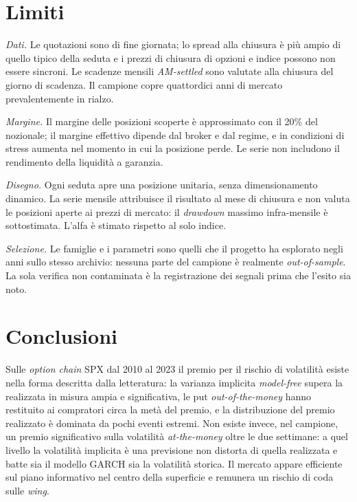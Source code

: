 \documentclass[11pt,a4paper]{article}
\begin{document}
\section{Limiti}\label{sec:limiti}

\emph{Dati.} Le quotazioni sono di fine giornata; lo spread alla chiusura è più ampio di quello tipico della seduta e i prezzi di chiusura di opzioni e indice possono non essere sincroni. Le scadenze mensili \emph{AM-settled} sono valutate alla chiusura del giorno di scadenza. Il campione copre quattordici anni di mercato prevalentemente in rialzo.

\emph{Margine.} Il margine delle posizioni scoperte è approssimato con il 20\% del nozionale; il margine effettivo dipende dal broker e dal regime, e in condizioni di stress aumenta nel momento in cui la posizione perde. Le serie non includono il rendimento della liquidità a garanzia.

\emph{Disegno.} Ogni seduta apre una posizione unitaria, senza dimensionamento dinamico. La serie mensile attribuisce il risultato al mese di chiusura e non valuta le posizioni aperte ai prezzi di mercato: il \emph{drawdown} massimo infra-mensile è sottostimata. L'alfa è stimato rispetto al solo indice.

\emph{Selezione.} Le famiglie e i parametri sono quelli che il progetto ha esplorato negli anni sullo stesso archivio: nessuna parte del campione è realmente \emph{out-of-sample}. La sola verifica non contaminata è la registrazione dei segnali prima che l'esito sia noto.

\section{Conclusioni}\label{sec:concl}

Sulle \emph{option chain} SPX dal 2010 al 2023 il premio per il rischio di volatilità esiste nella forma descritta dalla letteratura: la varianza implicita \emph{model-free} supera la realizzata in misura ampia e significativa, le put \emph{out-of-the-money} hanno restituito ai compratori circa la metà del premio, e la distribuzione del premio realizzato è dominata da pochi eventi estremi. Non esiste invece, nel campione, un premio significativo sulla volatilità \emph{at-the-money} oltre le due settimane: a quel livello la volatilità implicita è una previsione non distorta di quella realizzata e batte sia il modello GARCH sia la volatilità storica. Il mercato appare efficiente sul piano informativo nel centro della superficie e remunera un rischio di coda sulle \emph{wing}.
\end{document}
